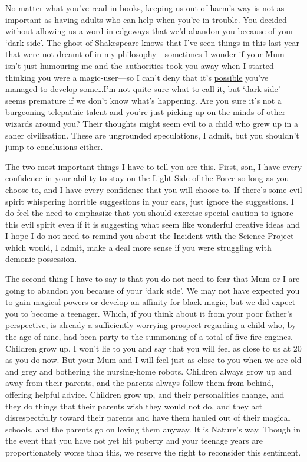 \begin{writtenNote}

No matter what you’ve read in books, keeping us out of harm’s way is \underline{not} as important as having adults who can help when you’re in trouble. You decided without allowing us a word in edgeways that we’d abandon you because of your ‘dark side’. The ghost of Shakespeare knows that I’ve seen things in this last year that were not dreamt of in my philosophy—sometimes I wonder if your Mum isn’t just humouring me and the authorities took you away when I started thinking you were a magic-user—so I can’t deny that it’s \underline{possible} you’ve managed to develop some…I’m not quite sure what to call it, but ‘dark side’ seems premature if we don’t know what’s happening. Are you sure it’s not a burgeoning telepathic talent and you’re just picking up on the minds of other wizards around you? Their thoughts might seem evil to a child who grew up in a saner civilization. These are ungrounded speculations, I admit, but you shouldn’t jump to conclusions either.

The two most important things I have to tell you are this. First, son, I have \underline{every} confidence in your ability to stay on the Light Side of the Force so long as you choose to, and I have every confidence that you will choose to. If there’s some evil spirit whispering horrible suggestions in your ears, just ignore the suggestions. I \underline{do} feel the need to emphasize that you should exercise special caution to ignore this evil spirit even if it is suggesting what seem like wonderful creative ideas and I hope I do not need to remind you about the Incident with the Science Project which would, I admit, make a deal more sense if you were struggling with demonic possession.

The second thing I have to say is that you do not need to fear that Mum or I are going to abandon you because of your ‘dark side’. We may not have expected you to gain magical powers or develop an affinity for black magic, but we did expect you to become a teenager. Which, if you think about it from your poor father’s perspective, is already a sufficiently worrying prospect regarding a child who, by the age of nine, had been party to the summoning of a total of five fire engines. Children grow up. I won’t lie to you and say that you will feel as close to us at 20 as you do now. But your Mum and I will feel just as close to you when we are old and grey and bothering the nursing-home robots. Children always grow up and away from their parents, and the parents always follow them from behind, offering helpful advice. Children grow up, and their personalities change, and they do things that their parents wish they would not do, and they act disrespectfully toward their parents and have them hauled out of their magical schools, and the parents go on loving them anyway. It is Nature’s way. Though in the event that you have not yet hit puberty and your teenage years are proportionately worse than this, we reserve the right to reconsider this sentiment.


\end{writtenNote}
